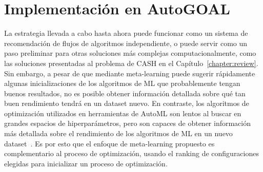 
\section{Implementación en AutoGOAL}\label{sec:autogoal_imp}


La estrategia llevada a cabo hasta ahora puede funcionar como un sistema de recomendación de flujos de algoritmos independiente, o puede servir como un paso preliminar para otras soluciones más complejas computacionalmente, como las soluciones presentadas al problema de CASH en el Capítulo~\ref{chapter:review}. Sin embargo, a pesar de que mediante meta-learning puede sugerir rápidamente algunas inicializaciones de los algoritmos de ML que probablemente tengan buenos resultados, no es posible obtener información detallada sobre qué tan buen rendimiento tendrá en un dataset nuevo. En contraste, los algoritmos de optimización utilizados en herramientas de AutoML son lentos al buscar en grandes espacios de hiperparámetros, pero son capaces de obtener información más detallada sobre el rendimiento de los algoritmos de ML en un nuevo dataset~\cite{fuerer2015efficient}. Es por esto que el enfoque de meta-learning propuesto es complementario al proceso de optimización, usando el ranking de configuraciones elegidas para inicializar un proceso de optimización.

